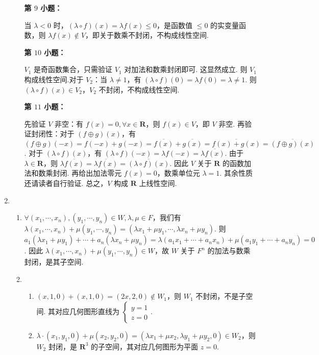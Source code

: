 \begin{enumerate}
\begin{enumerate}
        \textbf{第 $9$ 小题：}

        当 $\lambda<0$ 时，$(\lambda\circ f)(x)=\lambda f(x)\le 0$，是函数值 $\le0$ 的实变量函数，则 $\lambda f(x)\not\in V$，即关于数乘不封闭，不构成线性空间.

        \textbf{第 $10$ 小题：}

        $V_1$ 是奇函数集合，只需验证 $V_1$ 对加法和数乘封闭即可. 这显然成立. 则 $V_1$ 构成线性空间.对于 $V_2$：当 $\lambda\ne 1$，有 $(\lambda\circ f)(0)=\lambda f(0)=\lambda\ne 1$. 则 $(\lambda\circ f)(x)\in V_2$，$V_2$ 不封闭，不构成线性空间.

        \textbf{第 $11$ 小题：}

        先验证 $V$ 非空：有 $f(x)=0,\forall x\in \mathbf{R}$，则 $f(x)\in V$，即 $V$ 非空. 再验证封闭性：对于 $(f\oplus g)(x)$，有 $(f\oplus g)(-x)=f(-x)+g(-x)=\overline{f(x)}+\overline{g(x)}=\overline{f(x)+g(x)}=\overline{(f\oplus g)(x)}$. 对于 $(\lambda\circ f)(x)$，有 $(\lambda\circ f)(-x)=\lambda f(-x)=\lambda\overline{f(x)}$. 由于 $\lambda \in \mathbf{R}$，则 $\lambda \overline{f(x)}=\overline{\lambda f(x)}=\overline{(\lambda\circ f)(x)}$. 因此 $V$ 关于 $\mathbf{R}$ 的函数加法和数乘封闭. 再给出加法零元 $f(x)=0$，数乘单位元 $\lambda=1$. 其余性质还请读者自行验证. 总之，$V$ 构成 $\mathbf{R}$ 上线性空间.
    \end{enumerate}
    \item \begin{enumerate}
        \item $\forall (x_1,\cdots,x_n),(y_1,\cdots,y_n)\in W,\lambda,\mu\in F$，我们有$\lambda(x_1,\cdots,x_n)+\mu(y_1,\cdots,y_n)=(\lambda x_1+\mu y_1,\cdots,\lambda x_n+\mu y_n)$. 则 $a_1(\lambda x_1+\mu y_1)+\cdots+a_n(\lambda x_n+\mu y_n)=\lambda(a_1x_1+\cdots+a_nx_n)+\mu(a_1y_1+\cdots+a_ny_n)=0$. 因此 $\lambda(x_1,\cdots,x_n)+\mu(y_1,\cdots,y_n)\in W$，故 $W$ 关于 $F^n$ 的加法与数乘封闭，是其子空间.

        \item \begin{enumerate}
            \item $(x,1,0)+(x,1,0)=(2x,2,0)\not\in W_1$，则 $W_1$ 不封闭，不是子空间. 其对应几何图形直线为 $\begin{cases}
                y=1 \\ z=0
            \end{cases}$.
            \item $\lambda\cdot(x_1,y_1,0)+\mu(x_2,y_2,0)=(\lambda x_1+\mu x_2,\lambda y_1+\mu y_2,0)\in W_2$，则 $W_2$ 封闭，是 $\mathbf{R}^3$ 的子空间，其对应几何图形为平面 $z=0$.
        \end{enumerate}


\end{enumerate}
\end{enumerate}
